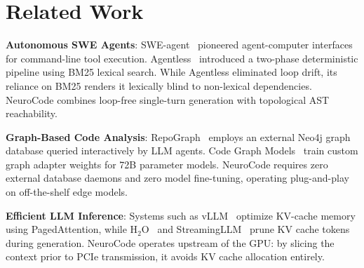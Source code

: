 \section{Related Work}
\label{sec:related}

\textbf{Autonomous SWE Agents}: SWE-agent~\cite{yang2024sweagent} pioneered agent-computer interfaces for command-line tool execution. Agentless~\cite{xia2024agentless} introduced a two-phase deterministic pipeline using BM25 lexical search. While Agentless eliminated loop drift, its reliance on BM25 renders it lexically blind to non-lexical dependencies. NeuroCode combines loop-free single-turn generation with topological AST reachability.

\textbf{Graph-Based Code Analysis}: RepoGraph~\cite{repograph2025} employs an external Neo4j graph database queried interactively by LLM agents. Code Graph Models~\cite{codegraph2025} train custom graph adapter weights for 72B parameter models. NeuroCode requires zero external database daemons and zero model fine-tuning, operating plug-and-play on off-the-shelf edge models.

\textbf{Efficient LLM Inference}: Systems such as vLLM~\cite{kwon2023vllm} optimize KV-cache memory using PagedAttention, while H$_2$O~\cite{zhang2023h2o} and StreamingLLM~\cite{xiao2024streamingllm} prune KV cache tokens during generation. NeuroCode operates upstream of the GPU: by slicing the context prior to PCIe transmission, it avoids KV cache allocation entirely.
